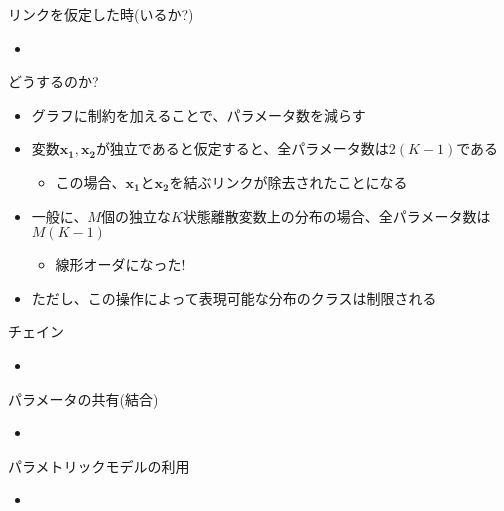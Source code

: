 \begin{frame}{リンクを仮定した時(いるか?)}
 \begin{itemize}
  \item %
 \end{itemize}
\end{frame}

\begin{frame}{どうするのか?}
 \begin{itemize}
  \item グラフに制約を加えることで、パラメータ数を減らす
  \item 変数$\bm{x_1}, \bm{x_2}$が独立であると仮定すると、全パラメータ数は$2(K-1)$である
        \begin{itemize}
         \item この場合、$\bm{x_1}$と$\bm{x_2}$を結ぶリンクが除去されたことになる
        \end{itemize}
  \item 一般に、$M$個の独立な$K$状態離散変数上の分布の場合、全パラメータ数は$M(K-1)$
        \begin{itemize}
         \item \alert{線形オーダになった!}
        \end{itemize}
  \item ただし、この操作によって表現可能な分布のクラスは制限される
 \end{itemize}
\end{frame}

\begin{frame}{チェイン}
 \begin{itemize}
  \item %
 \end{itemize}
\end{frame}

\begin{frame}{パラメータの共有(結合)}
 \begin{itemize}
  \item %
 \end{itemize}
\end{frame}

\begin{frame}{パラメトリックモデルの利用}
 \begin{itemize}
  \item %
 \end{itemize}
\end{frame}


